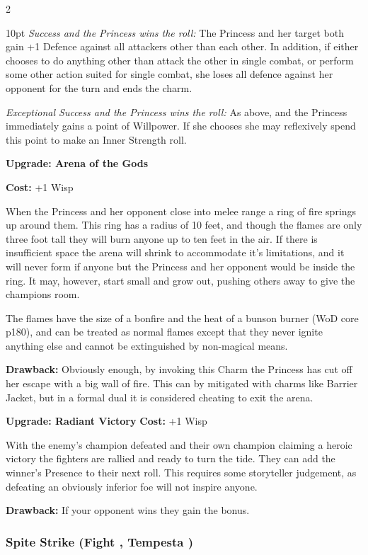 \begin{multicols}{2}
\begin{myindentpar}{10pt}
\emph{Success and the Princess wins the roll:} The Princess and her target both gain +1 Defence against all attackers other than each other. In addition, if either chooses to do anything other than attack the other in single combat, or perform some other action suited for single combat, she loses all defence against her opponent for the turn and ends the charm.

\emph{Exceptional Success and the Princess wins the roll:} As above, and the Princess immediately gains a point of Willpower. If she chooses she may reflexively spend this point to make an Inner Strength roll.

\textbf{Upgrade: Arena of the Gods}

\textbf{Cost:} +1 Wisp

When the Princess and her opponent close into melee range a ring of fire springs up around them. This ring has a radius of 10 feet, and though the flames are only three foot tall they will burn anyone up to ten feet in the air. If there is insufficient space the arena will shrink to accommodate it's limitations, and it will never form if anyone but the Princess and her opponent would be inside the ring. It may, however, start small and grow out, pushing others away to give the champions room.

The flames have the size of a bonfire and the heat of a bunson burner (WoD core p180), and can be treated as normal flames except that they never ignite anything else and cannot be extinguished by non-magical means.

\textbf{Drawback:} Obviously enough, by invoking this Charm the Princess has cut off her escape with a big wall of fire. This can by mitigated with charms like Barrier Jacket, but in a formal dual it is considered cheating to exit the arena.

\textbf{Upgrade: Radiant Victory}
\textbf{Cost:} +1 Wisp

With the enemy's champion defeated and their own champion claiming a heroic victory the fighters are rallied and ready to turn the tide. They can add the winner's Presence to their next roll. This requires some storyteller judgement, as defeating an obviously inferior foe will not inspire anyone. 

\textbf{Drawback:} If your opponent wins they gain the bonus.\end{myindentpar}

\subsubsection*{Spite Strike (Fight \textbullet\textbullet, Tempesta \textbullet)}


\end{multicols}
